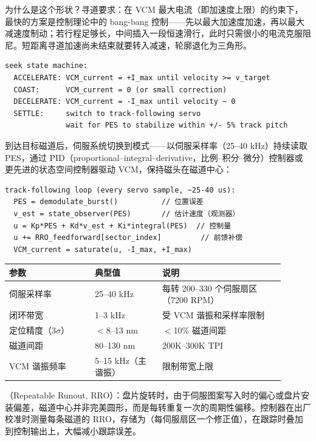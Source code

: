 为什么是这个形状？寻道要求：在 VCM 最大电流（即加速度上限）的约束下，最快的方案是控制理论中的 bang-bang 控制——先以最大加速度加速，再以最大减速度制动；若行程足够长，中间插入一段恒速滑行，此时只需很小的电流克服阻尼。短距离寻道加速尚未结束就要转入减速，轮廓退化为三角形。

\begin{lstlisting}
seek state machine:
  ACCELERATE: VCM_current = +I_max until velocity >= v_target
  COAST:      VCM_current = 0 (or small correction)
  DECELERATE: VCM_current = -I_max until velocity ~ 0
  SETTLE:     switch to track-following servo
              wait for PES to stabilize within +/- 5% track pitch
\end{lstlisting}


到达目标磁道后，伺服系统切换到模式——以伺服采样率（25--40 kHz）持续读取 PES，通过 PID（proportional--integral--derivative，比例--积分--微分）控制器或更先进的状态空间控制器驱动 VCM，保持磁头在磁道中心：

\begin{lstlisting}
track-following loop (every servo sample, ~25-40 us):
  PES = demodulate_burst()          // 位置误差
  v_est = state_observer(PES)       // 估计速度（观测器）
  u = Kp*PES + Kd*v_est + Ki*integral(PES)  // 控制量
  u += RRO_feedforward[sector_index]         // 前馈补偿
  VCM_current = saturate(u, -I_max, +I_max)
\end{lstlisting}

\begin{longtable}{L{0.28\linewidth}L{0.22\linewidth}L{0.4\linewidth}}
\toprule
参数 & 典型值 & 说明 \\
\midrule
伺服采样率 & 25--40 kHz & 每转 200--330 个伺服扇区（7200 RPM） \\
闭环带宽 & 1--3 kHz & 受 VCM 谐振和采样率限制 \\
定位精度（3$\sigma$） & $<$8--13 nm & $<$10\% 磁道间距 \\
磁道间距 & 80--130 nm & 200K--300K TPI \\
VCM 谐振频率 & 5--15 kHz（主谐振） & 限制带宽上限 \\
\bottomrule
\end{longtable}

（Repeatable Runout, RRO）：盘片旋转时，由于伺服图案写入时的偏心或盘片安装偏差，磁道中心并非完美圆形，而是每转重复一次的周期性偏移。控制器在出厂校准时测量每条磁道的 RRO，存储为（每伺服扇区一个修正值），在跟踪时叠加到控制输出上，大幅减小跟踪误差。

